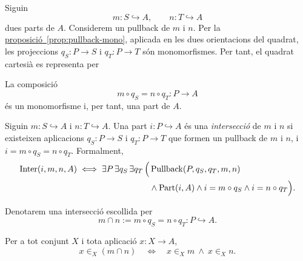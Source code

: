 Siguin
\[
m:S\hookrightarrow A,
\qquad
n:T\hookrightarrow A
\]
dues parts de \(A\). Considerem un pullback de \(m\) i \(n\). Per la \hyperref[prop:pullback-mono]{proposició~\ref*{prop:pullback-mono}}, aplicada en les dues orientacions del quadrat, les projeccions \(q_S:P\to S\) i \(q_T:P\to T\) són monomorfismes. Per tant, el quadrat cartesià es representa per
\begin{center}
\end{center}
La composició
\[
m\circ q_S=n\circ q_T:P\to A
\]
és un monomorfisme i, per tant, una part de \(A\).

\begin{definicio}[Intersecció]\label{def:interseccio}
Siguin \(m:S\hookrightarrow A\) i \(n:T\hookrightarrow A\). Una part \(i:P\hookrightarrow A\) és una \emph{intersecció} de \(m\) i \(n\) si existeixen aplicacions \(q_S:P\to S\) i \(q_T:P\to T\) que formen un pullback de \(m\) i \(n\), i \(i=m\circ q_S=n\circ q_T\). Formalment,
\[
\begin{aligned}
\operatorname{Inter}(i,m,n,A)
\iff
\exists P\,\exists q_S\,\exists q_T\,\Bigl(&
\operatorname{Pullback}(P,q_S,q_T,m,n)
\\
&{}\land\operatorname{Part}(i,A)
\land i=m\circ q_S
\land i=n\circ q_T
\Bigr).
\end{aligned}
\]
\end{definicio}

\begin{notacio}[Intersecció]\label{not:interseccio}
Denotarem una intersecció escollida per
\[
m\cap n:=m\circ q_S=n\circ q_T:P\hookrightarrow A.
\]
\end{notacio}

\begin{proposicio}\label{prop:pertinenca-interseccio}
Per a tot conjunt \(X\) i tota aplicació \(x:X\to A\),
\[
x\in_X(m\cap n)
\quad\Longleftrightarrow\quad
x\in_X m\ \land\ x\in_X n.
\]
\end{proposicio}

